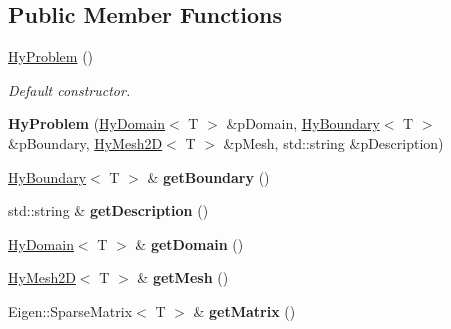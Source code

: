 \subsection*{Public Member Functions}
\begin{DoxyCompactItemize}
\item 
\hypertarget{classHyProblem_adc400712e624ef7107837a200082106a}{
\hyperlink{classHyProblem_adc400712e624ef7107837a200082106a}{HyProblem} ()}
\label{classHyProblem_adc400712e624ef7107837a200082106a}

\begin{DoxyCompactList}\small\item\em Default constructor. \item\end{DoxyCompactList}\item 
\hypertarget{classHyProblem_a7095777a5ace089bc97b94dca99b15e5}{
{\bfseries HyProblem} (\hyperlink{classHyDomain}{HyDomain}$<$ T $>$ \&pDomain, \hyperlink{classHyBoundary}{HyBoundary}$<$ T $>$ \&pBoundary, \hyperlink{classHyMesh2D}{HyMesh2D}$<$ T $>$ \&pMesh, std::string \&pDescription)}
\label{classHyProblem_a7095777a5ace089bc97b94dca99b15e5}

\item 
\hypertarget{classHyProblem_a83930a79d3e3129d9baccfc87dc5b644}{
\hyperlink{classHyBoundary}{HyBoundary}$<$ T $>$ \& {\bfseries getBoundary} ()}
\label{classHyProblem_a83930a79d3e3129d9baccfc87dc5b644}

\item 
\hypertarget{classHyProblem_a11d299a8fb714521e9372e9c52c83624}{
std::string \& {\bfseries getDescription} ()}
\label{classHyProblem_a11d299a8fb714521e9372e9c52c83624}

\item 
\hypertarget{classHyProblem_a5afc0faab283a084c4362789089300fa}{
\hyperlink{classHyDomain}{HyDomain}$<$ T $>$ \& {\bfseries getDomain} ()}
\label{classHyProblem_a5afc0faab283a084c4362789089300fa}

\item 
\hypertarget{classHyProblem_aa0d4e2347207b2e81aba21ff71d2d466}{
\hyperlink{classHyMesh2D}{HyMesh2D}$<$ T $>$ \& {\bfseries getMesh} ()}
\label{classHyProblem_aa0d4e2347207b2e81aba21ff71d2d466}

\item 
\hypertarget{classHyProblem_a69ec82f40bcde905ae9bed9b181680fe}{
Eigen::SparseMatrix$<$ T $>$ \& {\bfseries getMatrix} ()}
\label{classHyProblem_a69ec82f40bcde905ae9bed9b181680fe}


\end{DoxyCompactItemize}
